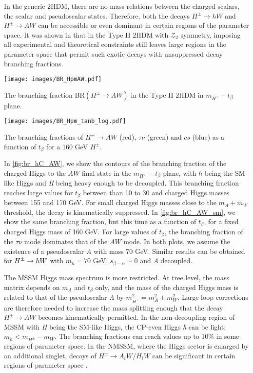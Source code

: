 In the generic $2$HDM, there are no mass relations between the charged scalars, the scalar and pseudoscalar states. Therefore, both the decays $H^{\pm} \rightarrow h W$ and $H^{\pm} \rightarrow A W$ can be accessible or even dominant in certain regions of the parameter space. It was shown in \cite{Coleppa:2013dya} that in the Type II $2$HDM with $\mathcal{Z}_2$ symmetry, imposing all experimental and theoretical constraints still leaves large regions in the parameter space that permit such exotic decays with unsuppressed decay branching fractions. 
\begin{marginfigure}[-5in]
 	\texttt{[image: images/BR\_HpmAW.pdf]}
    \caption{The branching fraction BR$( H^{\pm} \rightarrow AW)$ in the Type II $2$HDM in $m_{H^\pm}-t_{\beta}$ plane.}
    \label{fig:br_hC_AW}
\end{marginfigure}

\begin{marginfigure}[-1.2in]
 	\texttt{[image: images/BR\_Hpm\_tanb\_log.pdf]}
\caption{The branching fractions of $H^{\pm} \rightarrow AW$ (red), $\tau\nu$ (green) and $cs$ (blue) as a function of $t_{\beta}$ for a 160 GeV $H^{\pm}$.}
\label{fig:br_hC_AW_sm}
\end{marginfigure}

In \autoref{fig:br_hC_AW}, we show the contours of the branching fraction of the charged Higgs to the $AW$ final state in the $m_{H^{\pm}}-t_{\beta}$ plane, with $h$ being the SM-like Higgs and \emph{H} being heavy enough to be decoupled. This branching fraction reaches large values for $t_{\beta}$ between than 10 to 30 and charged Higgs masses between 155 and 170 GeV. For small charged Higgs masses close to the $m_A + m_W$ threshold, the decay is kinematically suppressed. In \autoref{fig:br_hC_AW_sm}, we show the same branching fraction, but this time as a function of $t_\beta$, for a fixed charged Higgs mass of 160 GeV. For large values of $t_{\beta}$, the branching fraction of the $\tau\nu$ mode dominates that of the $AW$ mode. In both plots, we assume the existence of a pseudoscalar \emph{A} with mass 70 GeV. Similar results can be obtained for $H^{\pm} \rightarrow h W$ with $m_{h} = 70$ GeV,  $s_{\beta-\alpha}\sim 0$ and \emph{A} decoupled. 

The MSSM Higgs mass spectrum is more restricted. At tree level, the mass matrix depends on $m_A$ and $t_{\beta}$ only, and the mass of the charged Higgs mass is related to that of the pseudoscalar \emph{A} by $m_{H^{\pm}}^2 =m_A^2 + m_W^2$. Large loop corrections are therefore needed to increase the mass splitting enough that the decay $H^{\pm} \rightarrow AW$ becomes kinematically permitted. In the non-decoupling region of MSSM with \emph{H} being the SM-like Higgs, the CP-even Higgs \emph{h} can be light: $m_{h}<m_{H^{\pm}}-m_W$. The branching fractions can reach values up to 10\% \cite{Heinemeyer:2013tqa} in some regions of parameter space. In the NMSSM, where the Higgs sector is enlarged by an additional singlet, decays of $H^{\pm} \rightarrow A_iW/H_iW$ can be significant in certain regions of parameter space \cite{Christensen:2013dra,Drees:1999sb}.

